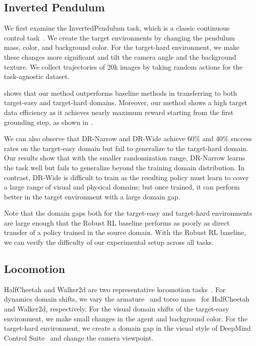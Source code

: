 \subsection{Inverted Pendulum}

We first examine the InvertedPendulum task, which is a classic continuous control task~\citep{brockman2016openai}. We create the target environments by changing the pendulum mass,  color, and background color. For the target-hard environment, we make these changes more significant and tilt the camera angle and the background texture. We collect trajectories of 20k images by taking random actions for the task-agnostic dataset.

 shows that our method outperforms baseline methods in transferring to both target-easy and target-hard domains. Moreover, our method shows a high target data efficiency as it achieves nearly maximum reward starting from the first grounding step, as shown in . 

We can also observe that DR-Narrow and DR-Wide achieve 60\% and 40\% success rates on the target-easy domain but fail to generalize to the target-hard domain.  Our results show that with the smaller randomization range, DR-Narrow learns the task well but fails to generalize beyond the training domain distribution. In contrast, DR-Wide is difficult to train as the resulting policy must learn to cover a large range of visual and physical domains; but once trained, it can perform better in the target environment with a large domain gap.

Note that the domain gaps both for the target-easy and target-hard environments are large enough that the Robust RL baseline performs as poorly as direct transfer of a policy trained in the source domain. With the Robust RL baseline, we can verify the difficulty of our experimental setup across all tasks.


\subsection{Locomotion}

HalfCheetah and Walker2d are two representative locomotion tasks~\citep{brockman2016openai}. For dynamics domain shifts, we vary the armature~\citep{zhang2021learning} and torso mass~\citep{desai2020imitation} for HalfCheetah and Walker2d, respectively. For the visual domain shifts of the target-easy environment, we make small changes in the agent and background color. For the target-hard environment, we create a domain gap in the visual style of DeepMind Control Suite~\citep{tassa2018deepmind} and change the camera viewpoint.

